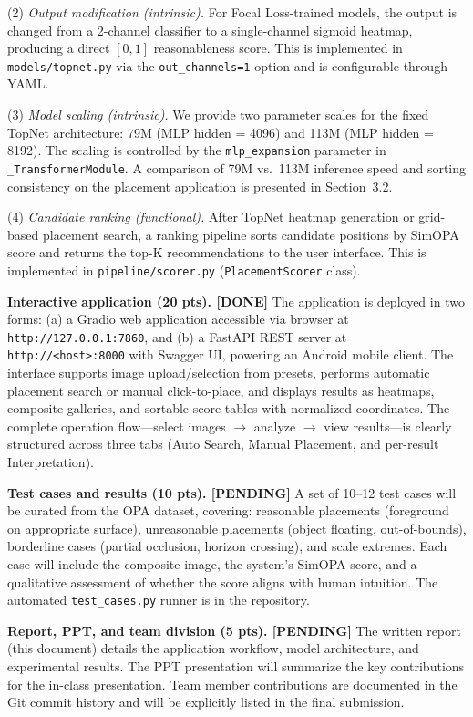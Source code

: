 \documentclass[10pt,twocolumn]{article}
\begin{document}
(2) \textit{Output modification (intrinsic).} For Focal Loss-trained models, the output is changed from a 2-channel classifier to a single-channel sigmoid heatmap, producing a direct $[0,1]$ reasonableness score. This is implemented in \texttt{models/topnet.py} via the \texttt{out\_channels=1} option and is configurable through YAML.

(3) \textit{Model scaling (intrinsic).} We provide two parameter scales for the fixed TopNet architecture: 79M (MLP hidden = 4096) and 113M (MLP hidden = 8192). The scaling is controlled by the \texttt{mlp\_expansion} parameter in \texttt{\_TransformerModule}. A comparison of 79M vs.\ 113M inference speed and sorting consistency on the placement application is presented in Section~3.2.

(4) \textit{Candidate ranking (functional).} After TopNet heatmap generation or grid-based placement search, a ranking pipeline sorts candidate positions by SimOPA score and returns the top-K recommendations to the user interface. This is implemented in \texttt{pipeline/scorer.py} (\texttt{PlacementScorer} class).

\textbf{Interactive application (20 pts). [DONE]} The application is deployed in two forms: (a) a Gradio web application accessible via browser at \texttt{http://127.0.0.1:7860}, and (b) a FastAPI REST server at \texttt{http://<host>:8000} with Swagger UI, powering an Android mobile client. The interface supports image upload/selection from presets, performs automatic placement search or manual click-to-place, and displays results as heatmaps, composite galleries, and sortable score tables with normalized coordinates. The complete operation flow---select images $\rightarrow$ analyze $\rightarrow$ view results---is clearly structured across three tabs (Auto Search, Manual Placement, and per-result Interpretation).

\textbf{Test cases and results (10 pts). [PENDING]} A set of 10--12 test cases will be curated from the OPA dataset, covering: reasonable placements (foreground on appropriate surface), unreasonable placements (object floating, out-of-bounds), borderline cases (partial occlusion, horizon crossing), and scale extremes. Each case will include the composite image, the system's SimOPA score, and a qualitative assessment of whether the score aligns with human intuition. The automated \texttt{test\_cases.py} runner is in the repository.

\textbf{Report, PPT, and team division (5 pts). [PENDING]} The written report (this document) details the application workflow, model architecture, and experimental results. The PPT presentation will summarize the key contributions for the in-class presentation. Team member contributions are documented in the Git commit history and will be explicitly listed in the final submission.
\end{document}
